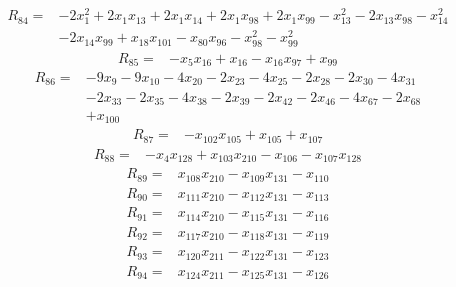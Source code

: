 \[
\begin{aligned}
R_{84}={}&-2x_{1}^{2}+2x_{1}x_{13}+2x_{1}x_{14}+2x_{1}x_{98}+2x_{1}x_{99}-x_{13}^{2}-2x_{13}x_{98}-x_{14}^{2}\\
&-2x_{14}x_{99}+x_{18}x_{101}-x_{80}x_{96}-x_{98}^{2}-x_{99}^{2}
\end{aligned}
\]
\[
\begin{aligned}
R_{85}={}&-x_{5}x_{16}+x_{16}-x_{16}x_{97}+x_{99}
\end{aligned}
\]
\[
\begin{aligned}
R_{86}={}&-9x_{9}-9x_{10}-4x_{20}-2x_{23}-4x_{25}-2x_{28}-2x_{30}-4x_{31}\\
&-2x_{33}-2x_{35}-4x_{38}-2x_{39}-2x_{42}-2x_{46}-4x_{67}-2x_{68}\\
&+x_{100}
\end{aligned}
\]
\[
\begin{aligned}
R_{87}={}&-x_{102}x_{105}+x_{105}+x_{107}
\end{aligned}
\]
\[
\begin{aligned}
R_{88}={}&-x_{4}x_{128}+x_{103}x_{210}-x_{106}-x_{107}x_{128}
\end{aligned}
\]
\[
\begin{aligned}
R_{89}={}&x_{108}x_{210}-x_{109}x_{131}-x_{110}
\end{aligned}
\]
\[
\begin{aligned}
R_{90}={}&x_{111}x_{210}-x_{112}x_{131}-x_{113}
\end{aligned}
\]
\[
\begin{aligned}
R_{91}={}&x_{114}x_{210}-x_{115}x_{131}-x_{116}
\end{aligned}
\]
\[
\begin{aligned}
R_{92}={}&x_{117}x_{210}-x_{118}x_{131}-x_{119}
\end{aligned}
\]
\[
\begin{aligned}
R_{93}={}&x_{120}x_{211}-x_{122}x_{131}-x_{123}
\end{aligned}
\]
\[
\begin{aligned}
R_{94}={}&x_{124}x_{211}-x_{125}x_{131}-x_{126}
\end{aligned}
\]
